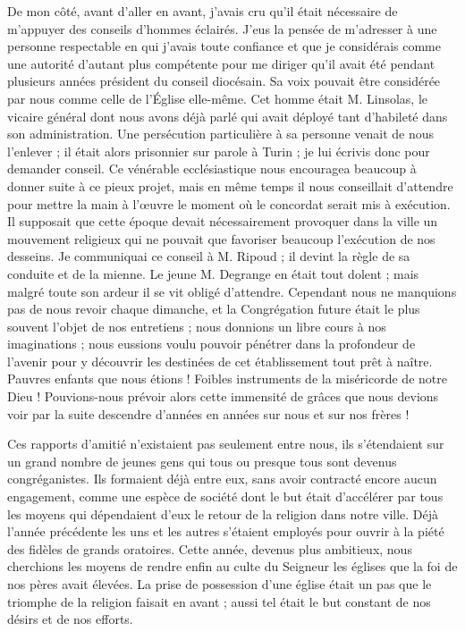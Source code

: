 De mon côté, avant d'aller en avant, j'avais cru qu'il était nécessaire de m'appuyer des conseils d'hommes éclairés. J'eus la pensée de m'adresser à une personne respectable en qui j'avais toute confiance et que je considérais comme une autorité d'autant plus compétente pour me diriger qu'il avait été pendant plusieurs années président du conseil diocésain. Sa voix pouvait être considérée par nous comme celle de l'Église elle-même. Cet homme était M. Linsolas, le vicaire général dont nous avons déjà parlé qui avait déployé tant d'habileté dans son administration. Une persécution particulière à sa personne venait de nous l'enlever ; il était alors prisonnier sur parole à Turin ; je lui écrivis donc pour demander conseil. Ce
vénérable ecclésiastique nous encouragea beaucoup à donner suite à ce pieux projet, mais en même temps il nous conseillait d'attendre pour mettre la main à l'œuvre le moment où le concordat serait mis à exécution. Il supposait que cette époque devait nécessairement provoquer dans la ville un mouvement religieux qui ne pouvait que favoriser beaucoup l'exécution de nos desseins. Je communiquai ce conseil à M. Ripoud ; il devint la règle de sa conduite et de la mienne. Le jeune M. Degrange en était tout dolent ; mais malgré toute son ardeur il se vit obligé d'attendre. Cependant nous ne manquions pas de nous revoir chaque dimanche, et la Congrégation future était le plus souvent l'objet de nos entretiens ; nous donnions un libre cours à nos imaginations ; nous eussions voulu pouvoir pénétrer dans la profondeur de l'avenir pour y découvrir les destinées de cet établissement tout prêt à naître. Pauvres enfants que nous étions ! Foibles instruments de la miséricorde de notre Dieu ! Pouvions-nous prévoir alors cette immensité de grâces que nous devions voir par la suite descendre d'années en années sur nous et sur nos frères !

Ces rapports d'amitié n'existaient pas seulement entre nous, ils s'étendaient sur un grand nombre de jeunes gens qui tous ou presque tous sont devenus congréganistes. Ils formaient déjà entre eux, sans avoir contracté encore aucun engagement, comme une espèce de société dont le but était d'accélérer par tous les moyens
qui dépendaient d'eux le retour de la religion dans notre ville. Déjà l'année précédente les uns et les autres s'étaient employés pour ouvrir à la piété des fidèles de grands oratoires. Cette année, devenus plus ambitieux, nous cherchions les moyens de rendre enfin au culte du Seigneur les églises que la foi de nos pères avait élevées. La prise de possession d'une église était un pas que le triomphe de la religion faisait en avant ; aussi tel était le but constant de nos désirs et de nos efforts.

